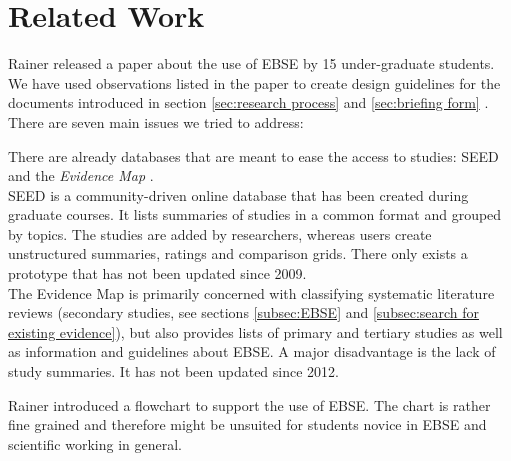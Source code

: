 
\section{Related Work}
\label{sec:related work}
Rainer \etal \cite{Rainer2006} released a paper about the use of EBSE by 15 under-graduate students. 
We have used observations listed in the paper to create design guidelines for the documents introduced in section \ref{sec:research process} and \ref{sec:briefing form} . There are seven main issues we tried to address:



There are already databases that are meant to ease the access to studies: SEED \cite{Janzen2008} and the \emph{Evidence Map} \cite{EBSEWeb}.\\
SEED is a community-driven online database that has been created during graduate courses. It lists summaries of studies in a common format and grouped by topics. The studies are added by researchers, whereas users create unstructured summaries, ratings and comparison grids. There only exists a prototype \cite{SEED} that has not been updated since 2009.\\
The Evidence Map is primarily concerned with  classifying systematic literature reviews (secondary studies, see sections \ref{subsec:EBSE} and \ref{subsec:search for existing evidence}), but also provides lists of primary and tertiary studies as well as information and guidelines about EBSE. A major disadvantage is the lack of study summaries. It has not been updated since 2012.

Rainer \etal \cite[p. 7]{Rainer2008} introduced a flowchart to support the use of EBSE. The chart is rather fine grained and therefore might be unsuited for students novice in EBSE and scientific working in general.